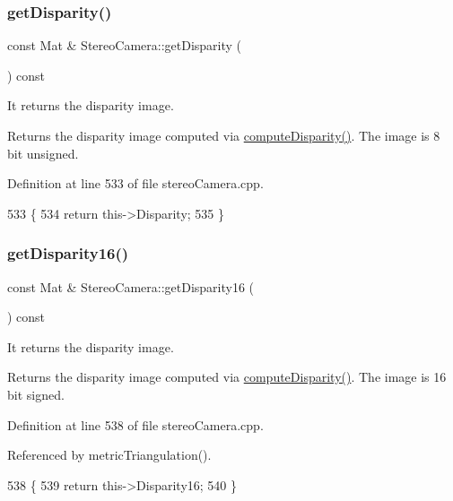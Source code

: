 \subsubsection{\texorpdfstring{get\+Disparity()}{getDisparity()}}
{\footnotesize\ttfamily const Mat \& Stereo\+Camera\+::get\+Disparity (\begin{DoxyParamCaption}{ }\end{DoxyParamCaption}) const}



It returns the disparity image. 

\begin{DoxyReturn}{Returns}
the disparity image computed via \hyperlink{classStereoCamera_a79e986f2970bb2c5b5acd1ede65984aa}{compute\+Disparity()}. The image is 8 bit unsigned. 
\end{DoxyReturn}


Definition at line 533 of file stereo\+Camera.\+cpp.


\begin{DoxyCode}
533                                             \{
534     \textcolor{keywordflow}{return} this->Disparity;
535 \}
\end{DoxyCode}
\mbox{\label{classStereoCamera_a4a6e408446750224499ed9ecdc51629e}} 
\subsubsection{\texorpdfstring{get\+Disparity16()}{getDisparity16()}}
{\footnotesize\ttfamily const Mat \& Stereo\+Camera\+::get\+Disparity16 (\begin{DoxyParamCaption}{ }\end{DoxyParamCaption}) const}



It returns the disparity image. 

\begin{DoxyReturn}{Returns}
the disparity image computed via \hyperlink{classStereoCamera_a79e986f2970bb2c5b5acd1ede65984aa}{compute\+Disparity()}. The image is 16 bit signed. 
\end{DoxyReturn}


Definition at line 538 of file stereo\+Camera.\+cpp.



Referenced by metric\+Triangulation().


\begin{DoxyCode}
538                                               \{
539     \textcolor{keywordflow}{return} this->Disparity16;
540 \}
\end{DoxyCode}
\mbox{\label{classStereoCamera_af9e52f941837f0db26d150d0ca4ff3bc}} 
